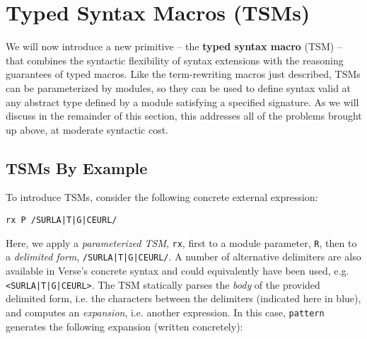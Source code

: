 
\section{Typed Syntax Macros (TSMs)}\label{sec:tsms}
We will now introduce a new primitive -- the \textbf{typed syntax macro} (TSM) -- that combines the syntactic flexibility of syntax extensions with the reasoning guarantees of typed macros. Like the term-rewriting macros just described, TSMs can be parameterized by modules, so they can be used to define syntax valid at any abstract type defined by a module satisfying a specified signature. As we will discuss in the remainder of this section, this addresses all of the problems brought up above, at moderate syntactic cost.


\subsection{TSMs By Example}\label{sec:tsms-by-example}
To introduce TSMs, consider the following concrete external expression:
\begin{lstlisting}[numbers=none]
rx P /SURLA|T|G|CEURL/
\end{lstlisting}
Here, we apply a \emph{parameterized TSM}, \lstinline{rx}, first to a module parameter, \lstinline{R}, then to a \emph{delimited form}, \lstinline{/SURLA|T|G|CEURL/}. A number of alternative delimiters are also available in Verse's concrete syntax and could equivalently have been used, e.g. \lstinline{<SURLA|T|G|CEURL>}. The TSM statically parses the \emph{body} of the provided delimited form, i.e. the characters between the delimiters (indicated here in blue), and computes an \emph{expansion}, i.e. another expression. In this case, \lstinline{pattern} generates the following expansion (written concretely):

